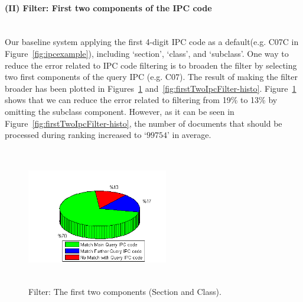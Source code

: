 \paragraph{(II) Filter: First two components of the IPC code}
\ \\
Our baseline system applying the first 4-digit IPC code as a default(e.g. C07C in Figure~\ref{fig:ipcexample}), including `section', `class', and `subclass'. One way to reduce the error related to IPC code filtering is to broaden the filter by selecting two first components of the query IPC (e.g. C07). The result of making the filter broader has been plotted in Figures~\ref{fig:ipc1stTwoElements} and~\ref{fig:firstTwoIpcFilter-histo}. Figure~\ref{fig:ipc1stTwoElements} shows that we can reduce the error related to filtering from 19\% to 13\% by omitting the subclass component. However, as it can be seen in Figure~\ref{fig:firstTwoIpcFilter-histo}, the number of documents that should be processed during ranking increased to `$ 99754 $' in average. 
\begin{figure}[t!]
   \centering
   \includegraphics[width=0.55\textwidth,height=60mm]{figs/ipc1stTwoElements.png}
   \caption{Filter: The first two components (Section and Class).}   
   \label{fig:ipc1stTwoElements} 
\end{figure}

